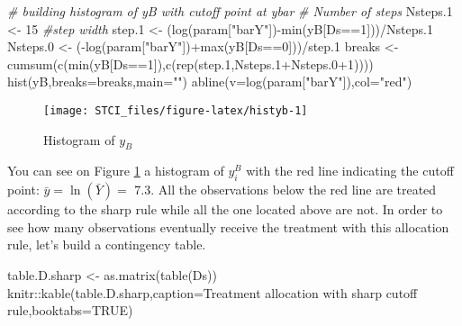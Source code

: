 \documentclass[
]{book}
\newenvironment{Shaded}{\begin{snugshade}}{\end{snugshade}}
\newcommand{\AttributeTok}[1]{\textcolor[rgb]{0.77,0.63,0.00}{#1}}
\newcommand{\CommentTok}[1]{\textcolor[rgb]{0.56,0.35,0.01}{\textit{#1}}}
\newcommand{\ConstantTok}[1]{\textcolor[rgb]{0.00,0.00,0.00}{#1}}
\newcommand{\DecValTok}[1]{\textcolor[rgb]{0.00,0.00,0.81}{#1}}
\newcommand{\FloatTok}[1]{\textcolor[rgb]{0.00,0.00,0.81}{#1}}
\newcommand{\FunctionTok}[1]{\textcolor[rgb]{0.00,0.00,0.00}{#1}}
\newcommand{\NormalTok}[1]{#1}
\newcommand{\OtherTok}[1]{\textcolor[rgb]{0.56,0.35,0.01}{#1}}
\newcommand{\SpecialCharTok}[1]{\textcolor[rgb]{0.00,0.00,0.00}{#1}}
\newcommand{\StringTok}[1]{\textcolor[rgb]{0.31,0.60,0.02}{#1}}
\theoremstyle{definition}
\theoremstyle{definition}
\theoremstyle{definition}
\theoremstyle{definition}
\theoremstyle{remark}
\begin{document}
\begin{Shaded}
\begin{Highlighting}[]
\CommentTok{\# building histogram of yB with cutoff point at ybar}
\CommentTok{\# Number of steps}
\NormalTok{Nsteps}\FloatTok{.1} \OtherTok{\textless{}{-}} \DecValTok{15}
\CommentTok{\#step width}
\NormalTok{step}\FloatTok{.1} \OtherTok{\textless{}{-}}\NormalTok{ (}\FunctionTok{log}\NormalTok{(param[}\StringTok{"barY"}\NormalTok{])}\SpecialCharTok{{-}}\FunctionTok{min}\NormalTok{(yB[Ds}\SpecialCharTok{==}\DecValTok{1}\NormalTok{]))}\SpecialCharTok{/}\NormalTok{Nsteps}\FloatTok{.1}
\NormalTok{Nsteps}\FloatTok{.0} \OtherTok{\textless{}{-}}\NormalTok{ (}\SpecialCharTok{{-}}\FunctionTok{log}\NormalTok{(param[}\StringTok{"barY"}\NormalTok{])}\SpecialCharTok{+}\FunctionTok{max}\NormalTok{(yB[Ds}\SpecialCharTok{==}\DecValTok{0}\NormalTok{]))}\SpecialCharTok{/}\NormalTok{step}\FloatTok{.1}
\NormalTok{breaks }\OtherTok{\textless{}{-}} \FunctionTok{cumsum}\NormalTok{(}\FunctionTok{c}\NormalTok{(}\FunctionTok{min}\NormalTok{(yB[Ds}\SpecialCharTok{==}\DecValTok{1}\NormalTok{]),}\FunctionTok{c}\NormalTok{(}\FunctionTok{rep}\NormalTok{(step}\FloatTok{.1}\NormalTok{,Nsteps}\FloatTok{.1}\SpecialCharTok{+}\NormalTok{Nsteps}\FloatTok{.0}\SpecialCharTok{+}\DecValTok{1}\NormalTok{))))}
\FunctionTok{hist}\NormalTok{(yB,}\AttributeTok{breaks=}\NormalTok{breaks,}\AttributeTok{main=}\StringTok{""}\NormalTok{)}
\FunctionTok{abline}\NormalTok{(}\AttributeTok{v=}\FunctionTok{log}\NormalTok{(param[}\StringTok{"barY"}\NormalTok{]),}\AttributeTok{col=}\StringTok{"red"}\NormalTok{)}
\end{Highlighting}
\end{Shaded}

\begin{figure}

{\centering \texttt{[image: STCI\_files/figure-latex/histyb-1]} 

}

\caption{Histogram of $y_B$}\label{fig:histyb}
\end{figure}

You can see on Figure \ref{fig:histyb} a histogram of \(y_i^B\) with the red line indicating the cutoff point: \(\bar{y}=\ln(\bar{Y})=\) 7.3.
All the observations below the red line are treated according to the sharp rule while all the one located above are not.
In order to see how many observations eventually receive the treatment with this allocation rule, let's build a contingency table.

\begin{Shaded}
\begin{Highlighting}[]
\NormalTok{table.D.sharp }\OtherTok{\textless{}{-}} \FunctionTok{as.matrix}\NormalTok{(}\FunctionTok{table}\NormalTok{(Ds))}
\NormalTok{knitr}\SpecialCharTok{::}\FunctionTok{kable}\NormalTok{(table.D.sharp,}\AttributeTok{caption=}\StringTok{\textquotesingle{}Treatment allocation with sharp cutoff rule\textquotesingle{}}\NormalTok{,}\AttributeTok{booktabs=}\ConstantTok{TRUE}\NormalTok{)}
\end{Highlighting}
\end{Shaded}
\end{document}
